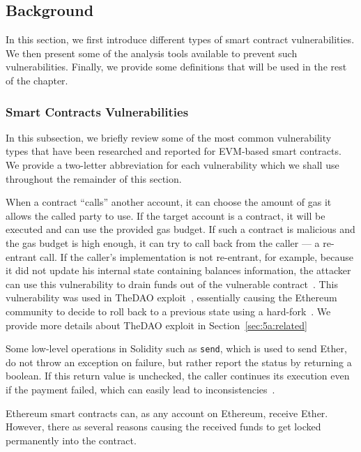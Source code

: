 \subsection{Background}
\label{sec:5a:background} 
In this section, we first introduce different types of smart contract vulnerabilities.
We then present some of the analysis tools available to prevent such vulnerabilities.
Finally, we provide some definitions that will be used in the rest of the chapter.

\subsubsection{Smart Contracts Vulnerabilities}
\label{ssec:vulnerability-types}
In this subsection, we briefly review some of the most common vulnerability types that have been researched and reported for EVM-based smart contracts.
We provide a two-letter abbreviation for each vulnerability which we shall use throughout the remainder of this section.

\point{\reentrancy~(\vre)}
When a contract ``calls'' another account, it can choose the amount of gas it allows the called party to use. If the target account is a contract, it will be executed and can use the provided gas budget. If such a contract is malicious and the gas budget is high enough, it can try to call back from the caller --- a re-entrant call. If the caller's implementation is not re-entrant, for example, because it did not update his internal state containing balances information, the attacker can use this vulnerability to drain funds out of the vulnerable contract~\cite{Luu2016a,DBLP:conf/ndss/KalraGDS18,Tsankov2018}.
This vulnerability was used in TheDAO exploit~\cite{Securities2017}, essentially causing the Ethereum community to decide to roll back to a previous state using a hard-fork~\cite{mehar2019understanding}. We provide more details about TheDAO exploit in Section~\ref{sec:5a:related}

\point{\unhandledexceptions~(\vue)}
Some low-level operations in Solidity such as \lstinline{send}, which is used to send Ether, do not throw an exception on failure, but rather report the status by returning a boolean.
If this return value is unchecked, the caller continues its execution even if the payment failed, which can easily lead to inconsistencies~\cite{Brent2018,Luu2016a,Tikhomirov2017,DBLP:conf/ndss/KalraGDS18}.

\point{\lockedether~(\vle)}
Ethereum smart contracts can, as any account on Ethereum, receive Ether. However, there as several reasons causing the received funds to get locked permanently into the contract.

